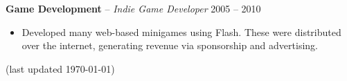 \documentclass{article}
\begin{document}
\textbf{Game Development} -- \emph{Indie Game Developer} \hfill 2005 -- 2010 \\[-6mm]
\begin{itemize}
  \item[]
  Developed many web-based minigames using Flash. These were distributed over the
  internet, generating revenue via sponsorship and advertising.
\end{itemize}

\vfill



\centering \small (last updated \today)
\end{document}
